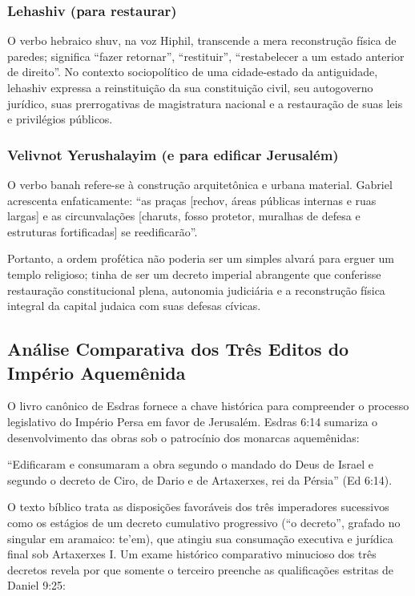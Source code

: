 \documentclass[11pt,a4paper,openany]{book}
\begin{document}
\subsubsection*{Lehashiv (para restaurar)}
O verbo hebraico shuv, na voz Hiphil, transcende a mera reconstrução física de paredes; significa ``fazer retornar'', ``restituir'', ``restabelecer a um estado anterior de direito''. No contexto sociopolítico de uma cidade-estado da antiguidade, lehashiv expressa a reinstituição da sua constituição civil, seu autogoverno jurídico, suas prerrogativas de magistratura nacional e a restauração de suas leis e privilégios públicos.

\subsubsection*{Velivnot Yerushalayim (e para edificar Jerusalém)}
O verbo banah refere-se à construção arquitetônica e urbana material. Gabriel acrescenta enfaticamente: ``as praças [rechov, áreas públicas internas e ruas largas] e as circunvalações [charuts, fosso protetor, muralhas de defesa e estruturas fortificadas] se reedificarão''.

Portanto, a ordem profética não poderia ser um simples alvará para erguer um templo religioso; tinha de ser um decreto imperial abrangente que conferisse restauração constitucional plena, autonomia judiciária e a reconstrução física integral da capital judaica com suas defesas cívicas.



\subsection{Análise Comparativa dos Três Editos do Império Aquemênida}


O livro canônico de Esdras fornece a chave histórica para compreender o processo legislativo do Império Persa em favor de Jerusalém. Esdras 6:14 sumariza o desenvolvimento das obras sob o patrocínio dos monarcas aquemênidas:

``Edificaram e consumaram a obra segundo o mandado do Deus de Israel e segundo o decreto de Ciro, de Dario e de Artaxerxes, rei da Pérsia'' (Ed 6:14).

O texto bíblico trata as disposições favoráveis dos três imperadores sucessivos como os estágios de um decreto cumulativo progressivo (``o decreto'', grafado no singular em aramaico: te'em), que atingiu sua consumação executiva e jurídica final sob Artaxerxes I. Um exame histórico comparativo minucioso dos três decretos revela por que somente o terceiro preenche as qualificações estritas de Daniel 9:25:
\end{document}
